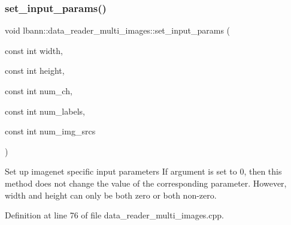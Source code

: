 \mbox{\label{classlbann_1_1data__reader__multi__images_a57824ec9de5c1131b2f15a0cb3d4ab75}} 
\subsubsection{\texorpdfstring{set\+\_\+input\+\_\+params()}{set\_input\_params()}\hspace{0.1cm}{\footnotesize\ttfamily [1/2]}}
{\footnotesize\ttfamily void lbann\+::data\+\_\+reader\+\_\+multi\+\_\+images\+::set\+\_\+input\+\_\+params (\begin{DoxyParamCaption}\item[{const int}]{width,  }\item[{const int}]{height,  }\item[{const int}]{num\+\_\+ch,  }\item[{const int}]{num\+\_\+labels,  }\item[{const int}]{num\+\_\+img\+\_\+srcs }\end{DoxyParamCaption})}

Set up imagenet specific input parameters If argument is set to 0, then this method does not change the value of the corresponding parameter. However, width and height can only be both zero or both non-\/zero. 

Definition at line 76 of file data\+\_\+reader\+\_\+multi\+\_\+images.\+cpp.


